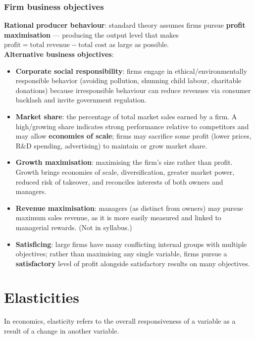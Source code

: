 \documentclass[a4paper,12pt]{article}
\begin{document}
\subsubsection*{Firm business objectives}
\textbf{Rational producer behaviour}: standard theory assumes firms pursue \textbf{profit maximisation} --- producing the output level that makes $\text{profit} = \text{total revenue} - \text{total cost}$ as large as possible.
\\
\textbf{Alternative business objectives}:
\begin{itemize}
  \item \textbf{Corporate social responsibility}: firms engage in ethical/environmentally responsible behavior (avoiding pollution, shunning child labour, charitable donations) because irresponsible behaviour can reduce revenues via consumer backlash and invite government regulation.
  \item \textbf{Market share}: the percentage of total market sales earned by a firm. A high/growing share indicates strong performance relative to competitors and may allow \textbf{economies of scale}; firms may sacrifice some profit (lower prices, R\&D spending, advertising) to maintain or grow market share.
  \item \textbf{Growth maximisation}: maximising the firm's size rather than profit. Growth brings economies of scale, diversification, greater market power, reduced risk of takeover, and reconciles interests of both owners and managers.
  \item \textbf{Revenue maximisation}: managers (as distinct from owners) may pursue maximum sales revenue, as it is more easily measured and linked to managerial rewards. (Not in syllabus.)
  \item \textbf{Satisficing}: large firms have many conflicting internal groups with multiple objectives; rather than maximising any single variable, firms pursue a \textbf{satisfactory} level of profit alongside satisfactory results on many objectives.
\end{itemize}
\section{Elasticities}
In economics, elasticity refers to the overall responsiveness of a variable as a result of a change in another variable.
\end{document}
